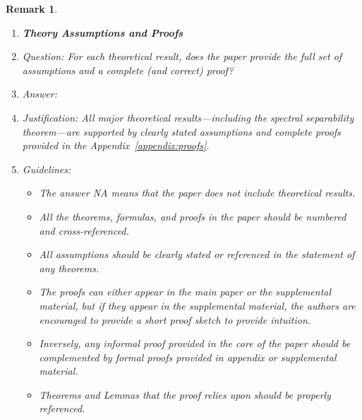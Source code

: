 \documentclass{article}
\newtheorem{remark}{Remark}
\begin{document}
\begin{remark}
\begin{enumerate}
\item {\bf Theory Assumptions and Proofs}
    \item[] Question: For each theoretical result, does the paper provide the full set of assumptions and a complete (and correct) proof?
    \item[] Answer: \answerYes{}
    \item[] Justification: All major theoretical results—including the spectral separability theorem—are supported by clearly stated assumptions and complete proofs provided in the Appendix~\ref{appendix:proofs}.
    \item[] Guidelines:
    \begin{itemize}
        \item The answer NA means that the paper does not include theoretical results. 
        \item All the theorems, formulas, and proofs in the paper should be numbered and cross-referenced.
        \item All assumptions should be clearly stated or referenced in the statement of any theorems.
        \item The proofs can either appear in the main paper or the supplemental material, but if they appear in the supplemental material, the authors are encouraged to provide a short proof sketch to provide intuition. 
        \item Inversely, any informal proof provided in the core of the paper should be complemented by formal proofs provided in appendix or supplemental material.
        \item Theorems and Lemmas that the proof relies upon should be properly referenced. 
    \end{itemize}


\end{enumerate}
\end{remark}
\end{document}
